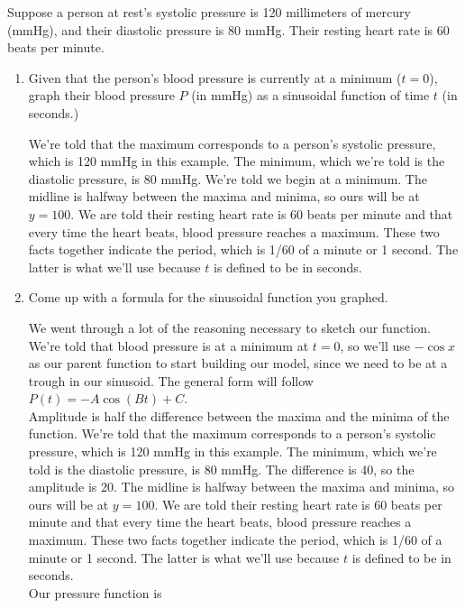 \documentclass[main]{subfiles}
\begin{document}
\begin{enumerate}[resume]
\begin{problem}
Suppose a person at rest's systolic pressure is 120 millimeters of mercury (mmHg), and their diastolic pressure is 80 mmHg. Their resting heart rate is 60 beats per minute.
\end{problem}

\begin{enumerate}
\item 
\begin{problem}
Given that the person's blood pressure is currently at a minimum ($t=0$), graph their blood pressure $P$ (in mmHg) as a sinusoidal function of time $t$ (in seconds.)
\end{problem}

\begin{solution}
     We're told that the maximum corresponds to a person's systolic pressure, which is 120 mmHg in this example. The minimum, which we're told is the diastolic pressure, is 80 mmHg. We're told we begin at a minimum. The midline is halfway between the maxima and minima, so ours will be at $y=100$. We are told their resting heart rate is 60 beats per minute and that every time the heart beats, blood pressure reaches a maximum. These two facts together indicate the period, which is 1/60 of a minute or 1 second. The latter is what we'll use because $t$ is defined to be in seconds. 
\end{solution}
\item
\begin{problem}
    Come up with a formula for the sinusoidal function you graphed.
\end{problem}
\pspace{\vfill}

\begin{solution}
     We went through a lot of the reasoning necessary to sketch our function. We're told that blood pressure is at a minimum at $t=0$, so we'll use $-\cos x$ as our parent function to start building our model, since we need to be at a trough in our sinusoid. The general form will follow $P(t)=-A\cos(Bt)+C$.\\
    Amplitude is half the difference between the maxima and the minima of the function. We're told that the maximum corresponds to a person's systolic pressure, which is 120 mmHg in this example. The minimum, which we're told is the diastolic pressure, is 80 mmHg. The difference is 40, so the amplitude is 20. The midline is halfway between the maxima and minima, so ours will be at $y=100$. We are told their resting heart rate is 60 beats per minute and that every time the heart beats, blood pressure reaches a maximum. These two facts together indicate the period, which is 1/60 of a minute or 1 second. The latter is what we'll use because $t$ is defined to be in seconds. \\
    Our pressure function is 
\end{solution}
\end{enumerate}


\end{enumerate}
\end{document}
